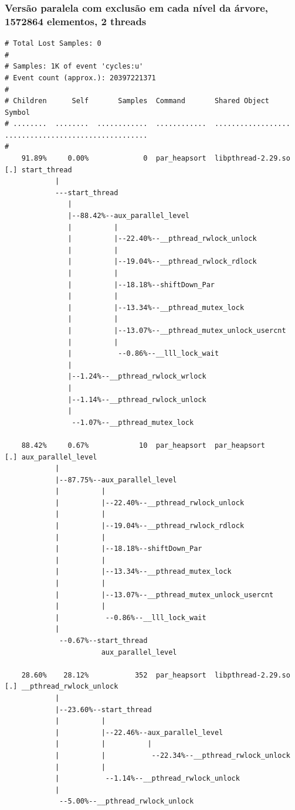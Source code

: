 \documentclass{article}
\begin{document}
\subsubsection{Versão paralela com exclusão em cada nível da árvore, 1572864 elementos, 2 threads}
\scriptsize
\begin{verbatim}
# Total Lost Samples: 0
#
# Samples: 1K of event 'cycles:u'
# Event count (approx.): 20397221371
#
# Children      Self       Samples  Command       Shared Object       Symbol
# ........  ........  ............  ............  ..................  ..................................
#
    91.89%     0.00%             0  par_heapsort  libpthread-2.29.so  [.] start_thread
            |
            ---start_thread
               |
               |--88.42%--aux_parallel_level
               |          |
               |          |--22.40%--__pthread_rwlock_unlock
               |          |
               |          |--19.04%--__pthread_rwlock_rdlock
               |          |
               |          |--18.18%--shiftDown_Par
               |          |
               |          |--13.34%--__pthread_mutex_lock
               |          |
               |          |--13.07%--__pthread_mutex_unlock_usercnt
               |          |
               |           --0.86%--__lll_lock_wait
               |
               |--1.24%--__pthread_rwlock_wrlock
               |
               |--1.14%--__pthread_rwlock_unlock
               |
                --1.07%--__pthread_mutex_lock

    88.42%     0.67%            10  par_heapsort  par_heapsort        [.] aux_parallel_level
            |
            |--87.75%--aux_parallel_level
            |          |
            |          |--22.40%--__pthread_rwlock_unlock
            |          |
            |          |--19.04%--__pthread_rwlock_rdlock
            |          |
            |          |--18.18%--shiftDown_Par
            |          |
            |          |--13.34%--__pthread_mutex_lock
            |          |
            |          |--13.07%--__pthread_mutex_unlock_usercnt
            |          |
            |           --0.86%--__lll_lock_wait
            |
             --0.67%--start_thread
                       aux_parallel_level

    28.60%    28.12%           352  par_heapsort  libpthread-2.29.so  [.] __pthread_rwlock_unlock
            |
            |--23.60%--start_thread
            |          |
            |          |--22.46%--aux_parallel_level
            |          |          |
            |          |           --22.34%--__pthread_rwlock_unlock
            |          |
            |           --1.14%--__pthread_rwlock_unlock
            |
             --5.00%--__pthread_rwlock_unlock


\end{verbatim}
\end{document}
